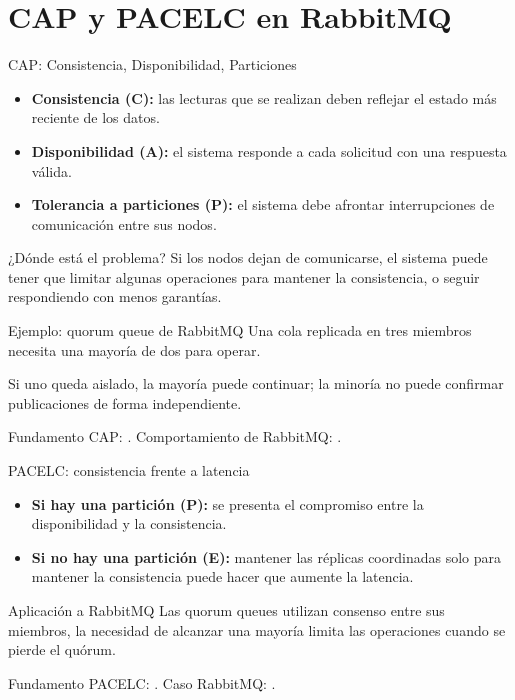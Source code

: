 
\section{CAP y PACELC en RabbitMQ}

\begin{frame}{CAP: Consistencia, Disponibilidad, Particiones}
  \small
  \begin{itemize}
    \item \textbf{Consistencia (C):} las lecturas que se realizan deben reflejar el estado más reciente de los datos.
    \item \textbf{Disponibilidad (A):} el sistema responde a cada solicitud con una respuesta válida.
    \item \textbf{Tolerancia a particiones (P):} el sistema debe afrontar interrupciones de comunicación entre sus nodos.
  \end{itemize}

  \begin{block}{¿Dónde está el problema?}
    Si los nodos dejan de comunicarse, el sistema puede tener que limitar algunas operaciones para mantener la consistencia, o seguir respondiendo con menos garantías.
  \end{block}

 \begin{block}{Ejemplo: quorum queue de RabbitMQ}
    Una cola replicada en tres miembros necesita
    una mayoría de dos para operar.

    Si uno queda aislado, la mayoría puede
    continuar; la minoría no puede confirmar
    publicaciones de forma independiente.
  \end{block}

  {\tiny Fundamento CAP: \cite{ahmed2023,myrhorodskyi2025}.
  Comportamiento de RabbitMQ: \cite{rabbitmq2026quorum}.}
\end{frame}

\begin{frame}{PACELC: consistencia frente a latencia}
  \small
  \begin{itemize}
    \item \textbf{Si hay una partición (P):} se presenta el compromiso entre la disponibilidad y la consistencia.
    \item \textbf{Si no hay una partición (E):} mantener las réplicas coordinadas solo para mantener la consistencia puede hacer que aumente la latencia.
  \end{itemize}

  \begin{block}{Aplicación a RabbitMQ}
    Las quorum queues utilizan consenso entre
    sus miembros, la necesidad de alcanzar
    una mayoría limita las operaciones cuando
    se pierde el quórum.
  \end{block}

  {\tiny Fundamento PACELC: \cite{ahmed2023,myrhorodskyi2025}.
  Caso RabbitMQ: \cite{rabbitmq2026quorum}.}
\end{frame}

